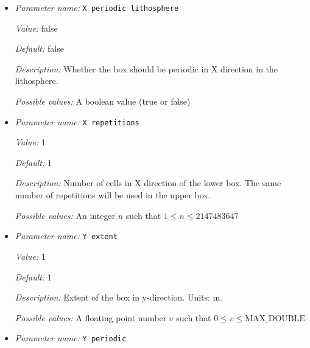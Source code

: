 \begin{itemize}
{\it Possible values:} A boolean value (true or false)
\item {\it Parameter name:} {\tt X periodic lithosphere}
\label{parameters:Geometry model/Box with lithosphere boundary indicators/X periodic lithosphere}
\label{parameters:Geometry_20model/Box_20with_20lithosphere_20boundary_20indicators/X_20periodic_20lithosphere}


{\it Value:} false


{\it Default:} false


{\it Description:} Whether the box should be periodic in X direction in the lithosphere.


{\it Possible values:} A boolean value (true or false)
\item {\it Parameter name:} {\tt X repetitions}
\label{parameters:Geometry model/Box with lithosphere boundary indicators/X repetitions}
\label{parameters:Geometry_20model/Box_20with_20lithosphere_20boundary_20indicators/X_20repetitions}


{\it Value:} 1


{\it Default:} 1


{\it Description:} Number of cells in X direction of the lower box. The same number of repetitions will be used in the upper box.


{\it Possible values:} An integer $n$ such that $1\leq n \leq 2147483647$
\item {\it Parameter name:} {\tt Y extent}
\label{parameters:Geometry model/Box with lithosphere boundary indicators/Y extent}
\label{parameters:Geometry_20model/Box_20with_20lithosphere_20boundary_20indicators/Y_20extent}


{\it Value:} 1


{\it Default:} 1


{\it Description:} Extent of the box in y-direction. Units: m.


{\it Possible values:} A floating point number $v$ such that $0 \leq v \leq \text{MAX\_DOUBLE}$
\item {\it Parameter name:} {\tt Y periodic}
\label{parameters:Geometry model/Box with lithosphere boundary indicators/Y periodic}
\label{parameters:Geometry_20model/Box_20with_20lithosphere_20boundary_20indicators/Y_20periodic}



\end{itemize}
